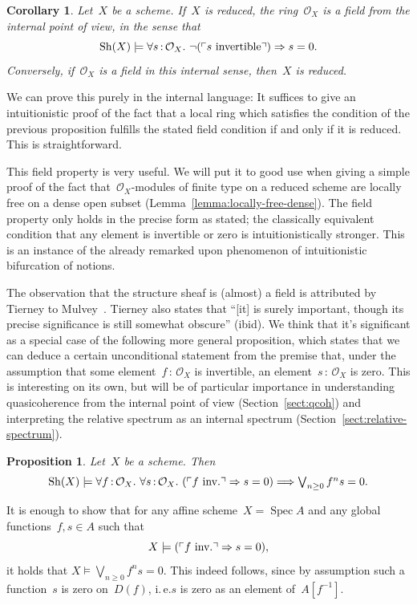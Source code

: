 \documentclass[10pt,reqno,a4paper]{amsbook}
\makeatletter
\theoremstyle{definition}
\theoremstyle{plain}
\newtheorem{prop}[defn]{Proposition}
\newtheorem{cor}[defn]{Corollary}
\theoremstyle{remark}
\renewcommand{\O}{\mathcal{O}}
\newcommand{\Sh}{\mathrm{Sh}}
\DeclareMathOperator{\Spec}{Spec}
\newcommand{\?}{\,{:}\,}
\renewcommand{\_}{\mathpunct{.}\,}
\newcommand{\speak}[1]{\ulcorner\text{\textnormal{#1}}\urcorner}
\newcommand{\ie}{i.\,e.\@\xspace}
\newcommand{\inv}{inv.\@}
\renewenvironment{proof}[1][\proofname]{\par
  \pushQED{\qed}%
  \normalfont \topsep6\p@\@plus6\p@\relax
  \trivlist
  \item[\hskip\labelsep
        \itshape
    #1\@addpunct{.}]\ignorespaces
}{%
  \popQED\endtrivlist\@endpefalse
}
\makeatother
\begin{document}
\begin{cor}\label{cor:field-reduced}
Let~$X$ be a scheme. If~$X$ is reduced, the ring~$\O_X$ is a field
from the internal point of view, in the sense that
\[ \Sh(X) \models \forall s\?\O_X\_ \neg(\speak{$s$ invertible}) \Rightarrow
s=0. \]
Conversely, if~$\O_X$ is a field in this internal sense, then~$X$ is reduced.\end{cor}
\begin{proof}We can prove this purely in the internal language: It suffices to
give an intuitionistic proof of the fact that a local ring which satisfies the
condition of the previous proposition fulfills the stated field condition if
and only if it is reduced. This is straightforward.
\end{proof}

This field property is very useful. We will put it to good use when giving a
simple proof of the fact that~$\O_X$-modules of finite type on a reduced scheme
are locally free on a dense open subset (Lemma~\ref{lemma:locally-free-dense}).
The field property only holds in the precise form as stated;
the classically equivalent condition that any element is invertible or zero is
intuitionistically stronger. This is an instance of the already remarked upon
phenomenon of intuitionistic bifurcation of notions.

The observation that the structure sheaf is (almost) a field is attributed by
Tierney to Mulvey~\cite[p.~209]{tierney:spectrum}.
Tierney also states that ``[it] is surely important, though its precise significance is still somewhat
obscure'' (ibid). We think that it's significant as a special case of the
following more general proposition,
which states that we can deduce a certain unconditional
statement from the premise that, under the assumption that some element~$f\?\O_X$ is invertible, an element~$s\?\O_X$ is zero. This is
interesting on its own, but will be of particular importance in understanding
quasicoherence from the internal point of view (Section~\ref{sect:qcoh}) and
interpreting the relative spectrum as an internal spectrum
(Section~\ref{sect:relative-spectrum}).

\begin{prop}\label{prop:cond-zero}
Let~$X$ be a scheme. Then
\[ \Sh(X) \models
  \forall f\?\O_X\_
  \forall s\?\O_X\_
  (\speak{$f$ \inv} \Rightarrow s = 0) \Longrightarrow
  \textstyle
  \bigvee_{n \geq 0} f^n s = 0. \]
\end{prop}
\begin{proof}It is enough to show that for any affine scheme~$X = \Spec A$ and
any global functions~$f, s \in A$ such that
\[ X \models (\speak{$f$ \inv} \Rightarrow s = 0), \]
it holds that $X \models \textstyle \bigvee_{n \geq 0} f^n s = 0$. This
indeed follows, since by assumption such a function~$s$ is zero on~$D(f)$, \ie $s$
is zero as an element of~$A[f^{-1}]$.
\end{proof}
\end{document}
